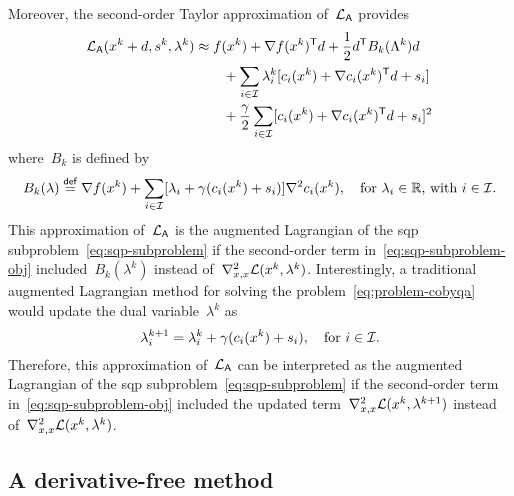 Moreover, the second-order Taylor approximation of~$\lag[\mathsf{A}]$ provides
\begin{align*}
    \lag[\mathsf{A}](x^k + d, s^k, \lambda^k)   & \approx \obj(x^k) + \nabla \obj(x^k)^{\T} d + \frac{1}{2} d^{\T} B_k(\Lambda^k) d\\
                                                & \qquad + \sum_{i \in \iub} \lambda_i^k [\con{i}(x^k) + \nabla \con{i}(x^k)^{\T} d + s_i]\\
                                                & \qquad + \frac{\gamma}{2} \sum_{i \in \iub} [\con{i}(x^k) + \nabla \con{i}(x^k)^{\T} d + s_i]^2\\
\end{align*}
where~$B_k$ is defined by
\begin{equation*}
    B_k(\lambda) \mathrel{\stackrel{\mathsf{def}}{=}} \nabla f(x^k) + \sum_{i \in \mathcal{I}} [\lambda_i + \gamma (c_{i}(x^k) + s_i)] \nabla^2 c_{i}(x^k), \quad \text{for~$\lambda_i \in \mathbb{R}$, with~$i \in \mathcal{I}$.}
\end{equation*}
This approximation of~$\lag[\mathsf{A}]$ is the augmented Lagrangian of the \gls{sqp} subproblem~\cref{eq:sqp-subproblem} if the second-order term in~\cref{eq:sqp-subproblem-obj} included~$B_k(\lambda^k)$ instead of~$\nabla_{x, x}^2 \lag(x^k, \lambda^k)$.
Interestingly, a traditional augmented Lagrangian method for solving the problem~\cref{eq:problem-cobyqa} would update the dual variable~$\lambda^k$ as
\begin{equation*}
    \lambda_i^{k + 1} = \lambda_i^k + \gamma (c_{i}(x^k) + s_i), \quad \text{for~$i \in \mathcal{I}$}.
\end{equation*}
Therefore, this approximation of~$\lag[\mathsf{A}]$ can be interpreted as the augmented Lagrangian of the \gls{sqp} subproblem~\cref{eq:sqp-subproblem} if the second-order term in~\cref{eq:sqp-subproblem-obj} included the updated term~$\nabla_{x, x}^2 \lag(x^k, \lambda^{k + 1})$ instead of~$\nabla_{x, x}^2 \lag(x^k, \lambda^k)$.

\subsection{A derivative-free  method}

